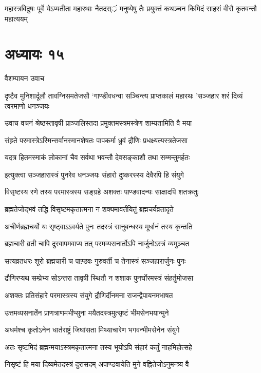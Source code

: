 \threelineshloka
{महास्त्रविदुषः पूर्वे येऽप्यतीता महारथाः}
{नैतदस््रं मनुष्येषु तैः प्रयुक्तं कथञ्चन}
{किमिदं साहसं वीरौ कृतवन्तौ महात्ययम्}


\chapter{अध्यायः १५}
\twolineshloka
{वैशम्पायन उवाच}
{}


\threelineshloka
{दृष्टैव मुनिशार्दूलौ तावग्निसमतेजसौ}
{`गाण्डीवधन्वा सञ्चिन्त्य प्राप्तकालं महारथः}
{'सञ्जहार शरं दिव्यं त्वरमाणो धनञ्जयः}


\twolineshloka
{उवाच वचनं श्रेष्ठस्तावृषी प्राञ्जलिस्तदा}
{प्रमुक्तमस्त्रमस्त्रेण शाम्यतामिति वै मया}


\twolineshloka
{संहृते परमास्त्रेऽस्मिन्सर्वानस्मानशेषतः}
{पापकर्मा ध्रुवं द्रौणिः प्रधक्ष्यत्यस्त्रतेजसा}


\twolineshloka
{यदत्र हितमस्माकं लोकानां चैव सर्वथा}
{भवन्तौ देवसङ्काशौ तथा सम्मन्तुमर्हतः}


\twolineshloka
{इत्युक्त्वा सञ्जहारास्त्रं पुनरेव धनञ्जयः}
{संहारो दुष्करस्स्य देवैरपि हि संयुगे}


\twolineshloka
{विसृष्टस्य रणे तस्य परमास्त्रस्य सङ्ग्रहे}
{अशक्तः पाण्डवादन्यः साक्षादपि शतक्रतुः}


\twolineshloka
{ब्रह्मतेजोद्भवं तद्धि विसृष्टमकृतात्मना}
{न शक्यमावर्तयितुं ब्रह्मचर्यव्रतादृते}


\twolineshloka
{अचीर्णब्रह्मचर्यो यः सृष्ट्वाऽऽवर्यते पुनः}
{तदस्त्रं सानुबन्धस्य मूर्धानं तस्य कृन्तति}


\twolineshloka
{ब्रह्मचारी व्रती चापि दुरवापमवाप्य तत्}
{परमव्यसनार्तोऽपि नार्जुनोऽस्त्रं व्यमुञ्चत}


\twolineshloka
{सत्यव्रतधरः शूरो ब्रह्मचारी च पाण़्डवः}
{गुरुवर्ती च तेनास्त्रं सञ्जहारार्जुनः पुनः}


\twolineshloka
{द्रौणिरप्यथ सम्प्रेभ्य सोऽन्तरा तावृषी स्थितौ}
{न शशाक पुनर्घोरमस्त्रं संहर्तुमोजसा}


\twolineshloka
{अशक्तः प्रतिसंहारे परमास्त्रस्य संयुगे}
{द्रौणिर्दीनमना राजन्द्वैपायनमभाषत}


\twolineshloka
{उत्तमव्यसनार्तेन प्राणत्राणमभीप्सुना}
{मयैतदस्त्रमुत्सृष्टं भीमसेनभयान्मुने}


\twolineshloka
{अधर्मश्च कृतोऽनेन धार्तराष्ट्रं जिघांसता}
{मिथ्याचारेण भगवन्भीमसेनेन संयुगे}


\twolineshloka
{अतः सृष्टमिदं ब्रह्मन्मयाऽस्त्रमकृतात्मना}
{तस्य भूयोऽपि संहारं कर्तुं नाहमिहोत्सहे}


\twolineshloka
{निसृष्टं हि मया दिव्यमेतदस्त्रं दुरासदम्}
{अपाण्डवायेति मुने वह्नितेजोऽनुमन्त्र्य वै}


